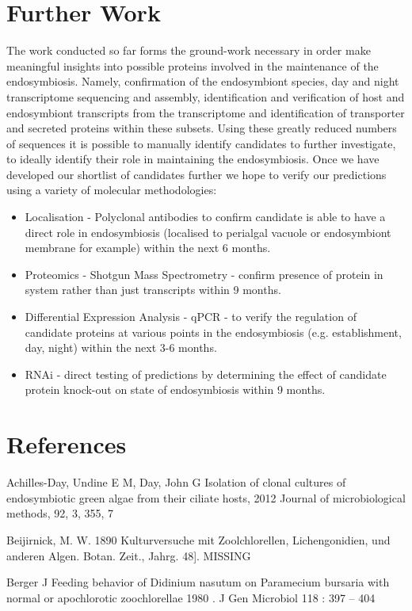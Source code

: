 \section{Further Work}
The work conducted so far forms the ground-work necessary in order make meaningful insights into possible proteins involved in the maintenance of the endosymbiosis.
Namely, confirmation of the endosymbiont species, day and night transcriptome sequencing and assembly, identification and verification of host and endosymbiont transcripts from the transcriptome and identification of transporter and secreted proteins within these subsets.  
Using these greatly reduced numbers of sequences it is possible to manually identify candidates to further investigate, to ideally identify their role in maintaining the endosymbiosis.  
Once we have developed our shortlist of candidates further we hope to verify our predictions using a variety of molecular methodologies:
\begin{itemize}
  \item Localisation - Polyclonal antibodies to confirm candidate is able to have a direct role in endosymbiosis (localised to perialgal vacuole or endosymbiont membrane for example) within the next 6 months.
  \item Proteomics - Shotgun Mass Spectrometry - confirm presence of protein in system rather than just transcripts within 9 months.
  \item Differential Expression Analysis - qPCR - to verify the regulation of candidate proteins at various points in the endosymbiosis (e.g. establishment, day, night) within the next 3-6 months.
  \item RNAi - direct testing of predictions by determining the effect of candidate protein knock-out on state of endosymbiosis within 9 months.
\end{itemize}

\section{References}

\noindent Achilles-Day, Undine E M,  Day, John G Isolation of clonal cultures of endosymbiotic green algae from their ciliate hosts, 2012 Journal of microbiological methods,  92,  3, 355, 7

 
\noindent Beijirnick, M. W. 1890 Kulturversuche mit Zoolchlorellen, Lichengonidien, und anderen Algen. Botan. Zeit., Jahrg. 48].   MISSING

 
\noindent Berger J  Feeding behavior of Didinium nasutum on Paramecium bursaria with normal or apochlorotic zoochlorellae 1980 . J Gen Microbiol 118 : 397 – 404

